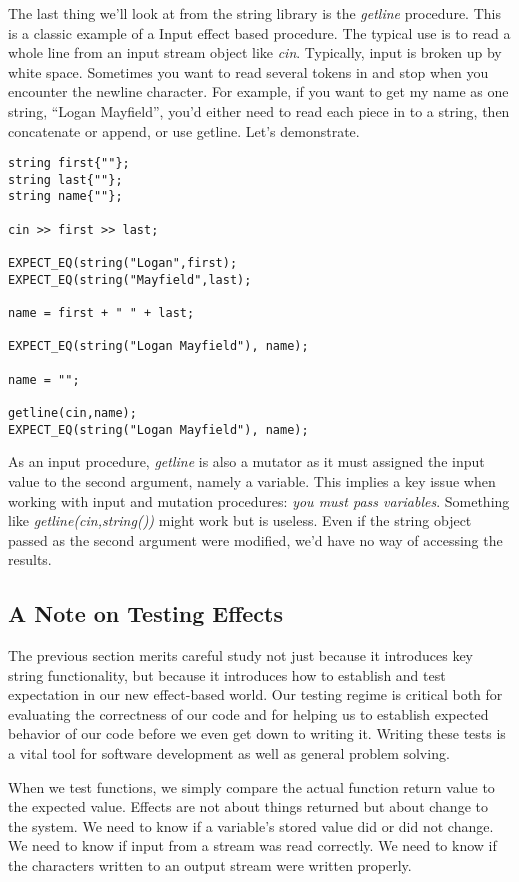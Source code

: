 \documentclass[]{tufte-handout}
\begin{document}
The last thing we'll look at from the string library is the \textit{getline} procedure. This is a classic example of a Input effect based procedure. The typical use is to read a whole line from an input stream object like \textit{cin}.  Typically, input is broken up by white space. Sometimes you want to read several tokens in and stop when you encounter the newline character.  For example, if you want to get my name as one string, ``Logan Mayfield'', you'd either need to read each piece in to a string, then concatenate or append, or use getline. Let's demonstrate.
\begin{verbatim}
string first{""};
string last{""};
string name{""};

cin >> first >> last;

EXPECT_EQ(string("Logan",first);
EXPECT_EQ(string("Mayfield",last);

name = first + " " + last;

EXPECT_EQ(string("Logan Mayfield"), name);

name = "";

getline(cin,name);
EXPECT_EQ(string("Logan Mayfield"), name);
\end{verbatim}
As an input procedure, \textit{getline} is also a mutator as it must assigned the input value to the second argument, namely a variable. This implies a key issue when working with input and mutation procedures: \textit{you must pass variables}. Something like \textit{getline(cin,string())} might work but is useless. Even if the  string object passed as the second argument were modified, we'd have no way of accessing the results. 

\subsection{A Note on Testing Effects}

The previous section merits careful study not just because it introduces key string functionality, but because it introduces how to establish and test expectation in our new effect-based world. Our testing regime is critical both for evaluating the correctness of our code and for helping us to establish expected behavior of our code before we even get down to writing it. Writing these tests is a vital tool for software development as well as general problem solving.

When we test functions, we simply compare the actual function return value to the expected value. Effects are not about things returned but about change to the system. We need to know if a variable's stored value did or did not change. We need to know if input from a stream was read correctly. We need to know if the characters written to an output stream were written properly. 
\end{document}
